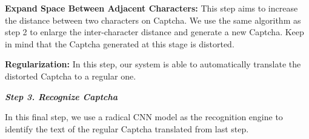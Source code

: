 \noindent \circling{\textcolor{white}{2}} \textbf{Expand Space Between Adjacent Characters:} This step aims to increase the distance between two characters on Captcha. We use the same algorithm as step 2 to enlarge the inter-character distance and generate a new Captcha. Keep in mind that the Captcha generated at this stage is distorted.

\noindent \circling{\textcolor{white}{3}} \textbf{Regularization:} In this step, our system is able to automatically translate the distorted Captcha to a regular one.

\noindent \textbf{\emph{Step 3. Recognize Captcha}}

In this final step, we use a radical CNN model as the recognition engine to identify the text of the regular Captcha translated from last step.



